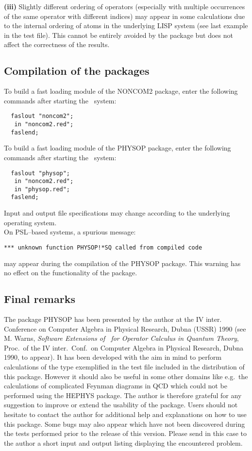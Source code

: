 {\bf (iii)} Slightly different ordering of operators (especially with
multiple occurrences of the same operator with different indices)
may appear in some calculations
due to the internal ordering of atoms in the underlying LISP system
(see last example in the test file). This cannot be entirely avoided
by the package but does not affect the correctness  of the results.

\subsection{Compilation of the packages}
To build a fast loading module of the NONCOM2 package, enter the
following commands after starting the \REDUCE\ system:

\begin{verbatim}
  faslout "noncom2";
   in "noncom2.red";
  faslend;
\end{verbatim}
To build a fast loading module of the PHYSOP package, enter the
following commands after starting the \REDUCE\ system:

\begin{verbatim}
  faslout "physop";
   in "noncom2.red";
   in "physop.red";
  faslend;
\end{verbatim}
Input and output file specifications may change according to the
underlying operating system. \\
On PSL--based systems, a spurious message:

\begin{verbatim}
*** unknown function PHYSOP!*SQ called from compiled code
\end{verbatim}
may appear during the compilation of the PHYSOP package. This warning
has no effect on the functionality of the package.

\subsection{Final remarks}
The package PHYSOP has been presented by
the author at the IV inter. Conference on Computer Algebra in Physical
Research, Dubna (USSR) 1990 (see M. Warns, {\it
Software Extensions of \REDUCE\ for Operator Calculus in Quantum Theory},
Proc.\ of the IV inter.\ Conf.\ on Computer Algebra in Physical
Research, Dubna 1990, to appear). It has been developed with the aim in
mind to perform calculations of the type exemplified in the test file
included in the distribution of this package.
However it should
also be useful in some other domains like e.g.\ the calculations of
complicated Feynman diagrams in QCD  which could not be  performed using
the HEPHYS package. The author is  therefore grateful for any
suggestion
to improve or extend the usability of the package. Users should not
hesitate to contact the author for additional help and explanations on
how to use
this package. Some bugs may also
appear which have not been discovered during the tests performed
prior to the release of this version. Please send in this case to the
author  a short
input and output listing  displaying the encountered problem.

